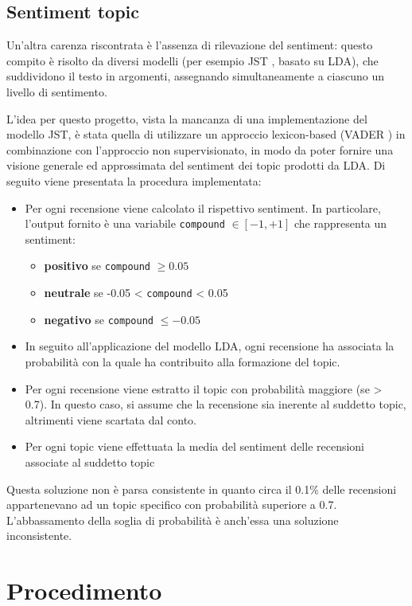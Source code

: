 \subsection{Sentiment topic}
Un'altra carenza riscontrata è l'assenza di rilevazione del sentiment: questo compito è risolto da diversi modelli (per esempio JST \cite{lin2009joint}, basato su LDA), che suddividono il testo in argomenti, assegnando simultaneamente a ciascuno un livello di sentimento.
\par
L'idea per questo progetto, vista la mancanza di una implementazione del modello JST, è stata quella di utilizzare un approccio lexicon-based (VADER \cite{hutto2014vader}) in combinazione con l'approccio non supervisionato, in modo da poter fornire una visione generale ed approssimata del sentiment dei topic prodotti da LDA. Di seguito viene presentata la procedura implementata:
\begin{itemize}
    \item Per ogni recensione viene calcolato il rispettivo sentiment. In particolare, l'output fornito è una variabile \texttt{compound} $\in [-1, +1]$ che rappresenta un sentiment:
        \begin{itemize}
            \item \textbf{positivo} se \texttt{compound} $\geq 0.05$
            \item \textbf{neutrale} se -0.05 < \texttt{compound} < 0.05
            \item \textbf{negativo} se \texttt{compound} $\leq -0.05$
        \end{itemize}
    \item In seguito all'applicazione del modello LDA, ogni recensione ha associata la probabilità con la quale ha contribuito alla formazione del topic.
    \item Per ogni recensione viene estratto il topic con probabilità maggiore (se > 0.7). In questo caso, si assume che la recensione sia inerente al suddetto topic, altrimenti viene scartata dal conto.
    \item Per ogni topic viene effettuata la media del sentiment delle recensioni associate al suddetto topic
\end{itemize}

Questa soluzione non è parsa consistente in quanto circa il 0.1\% delle recensioni appartenevano ad un topic specifico con probabilità superiore a 0.7. L'abbassamento della soglia di probabilità è anch'essa una soluzione inconsistente.

\section{Procedimento}

